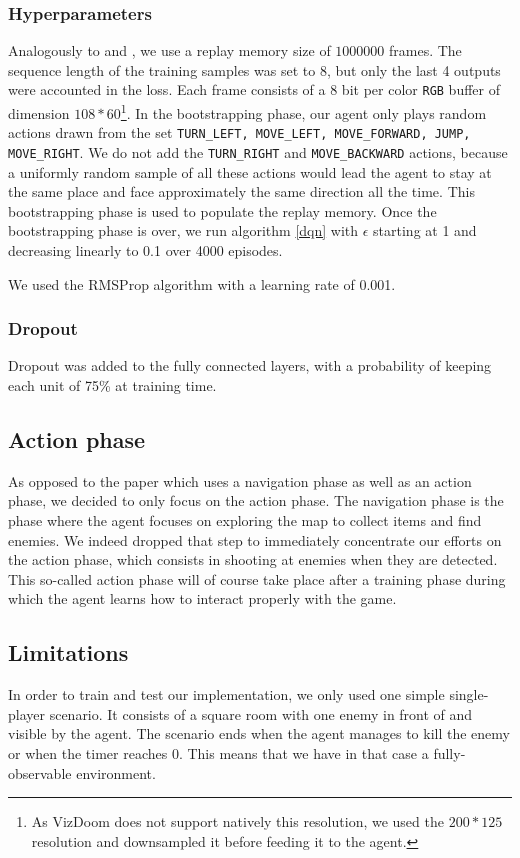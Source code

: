 \documentclass[letterpaper]{article}
\begin{document}
\subsubsection{Hyperparameters}
Analogously to \cite{Mnih2015} and \cite{Lample2016}, we use a replay memory
size of $1000000$ frames. The sequence length of
the training samples was set to 8, but only the last 4 outputs were accounted
in the loss.
Each frame consists of a 8 bit per color \texttt{RGB} buffer of dimension
$108 * 60$\footnote{As VizDoom does not support natively this resolution, we
used the $200 * 125$ resolution and downsampled it before feeding it to the
agent.}.
In the bootstrapping phase, our agent only plays random actions drawn from the
set \texttt{TURN\_LEFT, MOVE\_LEFT, MOVE\_FORWARD, JUMP, MOVE\_RIGHT}. We do
not add the \texttt{TURN\_RIGHT} and \texttt{MOVE\_BACKWARD} actions, because
a uniformly random sample of all these actions would lead the agent to stay
at the same place and face approximately the same direction all the time. This
bootstrapping phase is used to populate the replay memory. Once the
bootstrapping phase is over, we run algorithm \ref{dqn} with $\epsilon$ starting at
1 and decreasing linearly to 0.1 over 4000 episodes.

We used the RMSProp \citep{rmsprop} algorithm with a learning rate of 0.001.

\subsubsection{Dropout}
Dropout \citep{Srivastava2014} was added to the fully connected layers, with
a probability of keeping each unit of 75\% at training time.

\subsection{Action phase}
As opposed to the paper \citep{Lample2016} which uses a navigation phase as
well as an action phase, we decided to only focus on the action phase. The
navigation phase is the phase where the agent focuses on exploring the map to
collect items and find enemies. We indeed dropped that step to immediately
concentrate our efforts on the action phase, which consists in shooting at
enemies when they are detected. This so-called action phase will of course
take place after a training phase during which the agent learns how to interact
properly with the game.

\subsection{Limitations} In order to train and test our implementation, we only
used one simple single-player scenario. It consists of a square room with one
enemy in front of and visible by the agent. The scenario ends when the agent
manages to kill the enemy or when the timer reaches 0. This means that we have
in that case a fully-observable environment.\todo{}
\end{document}
